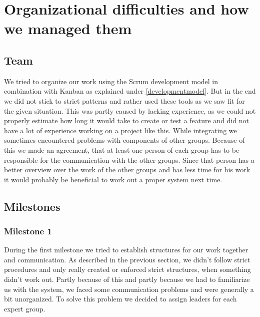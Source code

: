 \documentclass[main.tex]{subfiles}
\begin{document}
	\begingroup

	\renewcommand{\cleardoublepage}{}

	\renewcommand{\clearpage}{}

	\chapter{Organizational difficulties and how we managed them}

		
		\section{Team}
		We tried to organize our work using the Scrum development model in combination with Kanban as explained under \ref{developmentmodel}. But in the end we did not stick to strict patterns and rather used these tools as we saw fit for the given situation. This was partly caused by lacking experience, as we could not properly estimate how long it would take to create or test a feature and did not have a lot of experience working on a project like this.
		While integrating we sometimes encountered problems with components of other groups. Because of this we made an agreement, that at least one person of each group has to be responsible for the communication with the other groups. Since that person has a better overview over the work of the other groups and has less time for his work it would probably be beneficial to work out a proper system next time.
		
		\section{Milestones}
		
		\subsection{Milestone 1}
		During the first milestone we tried to establish structures for our work together and communication. As described in the previous section, we didn't follow strict procedures and only really created or enforced strict structures, when something didn't work out. Partly because of this and partly because we had to familiarize us with the system, we faced some communication problems and were generally a bit unorganized. To solve this problem we decided to assign leaders for each expert group.
		
\end{document}
